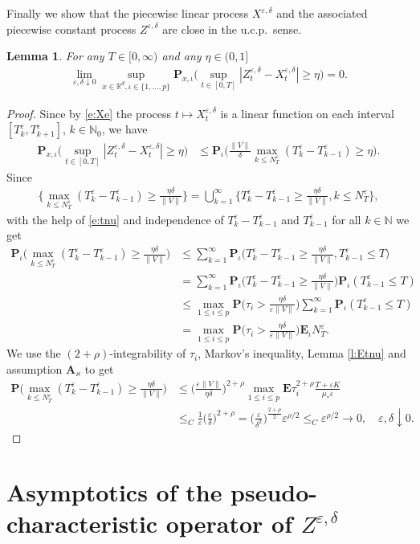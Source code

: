 \documentclass[10pt]{article}
\newcommand{\E}{\mathbf{E}}
\renewcommand{\P}{\mathbf{P}}
\newcommand{\1}{1\!\!\!\;{\rm I}}
\theoremstyle{plain}
\newtheorem{lem}[thm]{Lemma}
\theoremstyle{definition}
\newcommand{\e}{\varepsilon}
\newcommand{\ba}{\begin{equation}\begin{aligned}}
\newcommand{\ea}{\end{aligned}\end{equation}}
\newcommand{\bR}{\mathbb{R}}
\numberwithin{equation}{section}
\begin{document}
Finally we show that the piecewise linear process $X^{\e,\delta}$ and the associated piecewise constant process $Z^{\e,\delta}$
are close in the u.c.p.\ sense.

\begin{lem}
\label{l:ucp}
For any $T\in[0,\infty)$ and any $\eta\in(0,1]$
\ba
\lim_{\e,\delta \downarrow 0} \sup_{x\in\bR^d, \iota\in \{1,\dots, p\}}
\P_{x,\iota}\Big(\sup_{t\in[0,T]}|Z^{\e,\delta}_t - X^{\e,\delta}_t|\geq \eta\Big)=0.
\ea
\end{lem}
\begin{proof}
Since by \eqref{e:Xe} the process $t\mapsto X_t^{\e,\delta}$ is a linear
function on each interval $[T^\e_k,T^\e_{k+1}]$, $k\in\mathbb N_0$,
we have
\ba
\P_{x,\iota}\Big(\sup_{t\in[0,T]}|Z^{\e,\delta}_t - X^{\e,\delta}_t|\geq\eta\Big)
&\leq\P_{\iota}\Big(\frac{\|V\|}{\delta}\max_{k\leq N^\e_T}(T_k^\e-T_{k-1}^\e)\geq \eta\Big).
\ea
Since
\ba
\Big\{\max_{k\leq N^\e_T}(T^\e_k-T_{k-1}^\e)\geq \frac{\eta\delta}{\|V\|}\Big\}
=\bigcup_{k=1}^\infty\Big\{T^\e_k-T_{k-1}^\e \geq   \frac{\eta\delta}{\|V\|},k\leq N_T^\e\Big\} ,
\ea
with the help of \eqref{e:tnu} and independence of
$T^\e_k-T_{k-1}^\e$  and $T^\e_{k-1}$ for all $k\in\mathbb N$
we get
\ba
\label{e:enu}
\P_\iota\Big(\max_{k\leq N^\e_T}(T^\e_k-T_{k-1}^\e)\geq \frac{\eta\delta}{\|V\|}\Big)
&\leq \sum_{k=1}^\infty \P_\iota\Big(T^\e_k-T_{k-1}^\e \geq \frac{\eta\delta}{\|V\|},  T^\e_{k-1}\leq  T\Big) \\
&= \sum_{k=1}^\infty \P_\iota\Big(T^\e_k-T_{k-1}^\e \geq \frac{\eta\delta}{\|V\|}\Big)\P_\iota(T^\e_{k-1}\leq T) \\
&\leq \max_{1\leq i\leq p}\P\Big(\tau_i >\frac{\eta\delta}{\e \|V\|}\Big)\sum_{k=1}^\infty \P_\iota(T^\e_{k-1}\leq T)\\
&=\max_{1\leq i\leq p}\P\Big(\tau_i >\frac{\eta\delta}{\e \|V\|}\Big)\E_\iota N_T^\e.
\ea
We use the $(2+\rho)$-integrability of $\tau_i$, Markov's inequality, Lemma \ref{l:Etnu}
and assumption $\mathbf{A}_\varkappa$
to get
\ba
\P\Big(\max_{k\leq N^\e_T}(T^\e_k-T_{k-1}^\e)\geq \frac{\eta\delta}{\|V\|}\Big)
&\leq
\Big(\frac{\e \|V\|}{\eta\delta}\Big)^{2+\rho}\max_{1\leq i\leq p}\E\tau_i^{2+\rho}
\frac{T+\e K}{\mu_*\e}\\
&\leq_C \frac{1}{\e}\Big(\frac{\e}{\delta}\Big)^{2+\rho}
= \Big(\frac{\e}{\delta^2}\Big)^{\frac{2+\rho}{2}} \e^{\rho/2}
\leq_C \e^{\rho/2}
\to 0,\quad \e,\delta\downarrow 0.
\ea
\end{proof}

\section{Asymptotics of the pseudo-characteristic operator of $Z^{\e,\delta}$\label{s:operator}}
\end{document}
